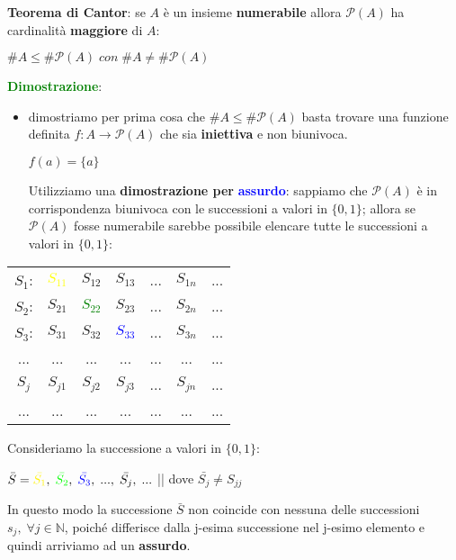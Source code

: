 \textbf{Teorema di Cantor}: se $A$ è un insieme \textbf{numerabile} allora $\mathcal{P}(A)$ ha cardinalità \textbf{maggiore} di $A$:
\begin{center}
    $\#A \leq \#\mathcal{P}(A) \; con \; \#A \neq \#\mathcal{P}(A)$
\end{center}
\textcolor{green}{\textbf{Dimostrazione}}: 
\begin{itemize}[nosep]
    \item dimostriamo per prima cosa che $\#A \leq \#\mathcal{P}(A)$ basta trovare una funzione definita $f : A \rightarrow \mathcal{P}(A)$ che sia \textbf{iniettiva} e non biunivoca.
    \begin{center}
        $f(a) = \{a\}$
    \end{center}
    Utilizziamo una \textbf{dimostrazione per} \textcolor{blue}{\textbf{assurdo}}: sappiamo che $\mathcal{P}(A)$ è in corrispondenza biunivoca con le successioni a valori in $\{0,1\}$; allora se $\mathcal{P}(A)$ fosse numerabile sarebbe possibile elencare tutte le successioni a valori in $\{0,1\}$:
\end{itemize}
\begin{center}
    \begin{tabular}{ccccccc}
        $S_1$: & \textcolor{yellow}{$S_{11}$} & $S_{12}$ & $S_{13}$ & ... & $S_{1n}$ & ... \\
        $S_2$: & $S_{21}$ & \textcolor{green}{$S_{22}$} & $S_{23}$ & ... & $S_{2n}$ & ... \\
        $S_3$: & $S_{31}$ & $S_{32}$ & \textcolor{blue}{$S_{33}$} & ... & $S_{3n}$ & ... \\
        ... & ... & ... & ... & ... & ... & ... \\
        $S_j$ & $S_{j1}$ & $S_{j2}$ & $S_{j3}$ & ... & $S_{jn}$ & ... \\
        ... & ... & ... & ... & ... & ... & ... \\
    \end{tabular}
\end{center}
Consideriamo la successione a valori in $\{0, 1\}$:
\begin{center}
    $\bar{S} = \textcolor{yellow}{\bar{S_1}}, \; \textcolor{green}{\bar{S_2}}, \; \textcolor{blue}{\bar{S_3}}, \; ..., \; \bar{S_j}, \; ...$ || dove $\bar{S_j} \neq S_{jj}$
\end{center}
In questo modo la successione $\bar{S}$ non coincide con nessuna delle successioni $s_j, \; \forall j \in \mathbb{N}$, poiché differisce dalla j-esima successione nel j-esimo elemento e quindi arriviamo ad un \textbf{assurdo}.
